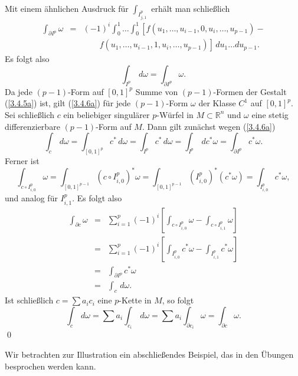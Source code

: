 \documentclass[a4paper,twoside,DIV15,BCOR12mm]{scrbook}
\begin{document}
Mit einem ähnlichen Ausdruck für $\int_{I_{j,1}^{p}}$ erhält man 
schließlich
\begin{eqnarray*}
\int_{\partial I^{p}} \omega & = & (-1)^{i} \int_{0}^{1} \dots 
\int_{0}^{1} \left[ f(u_{1},\dots,u_{i-1},0,u_{i},\dots,u_{p-1}) - 
\right. \\
&   & \qquad \left. 
f(u_{1},\dots,u_{i-1},1,u_{i},\dots,u_{p-1})\right] \, du_{1} \dots 
du_{p-1}. 
\end{eqnarray*}
Es folgt also
\begin{equation}\label{3.4.6a}
\int_{I^{p}} \, d\omega = \int_{\partial I^{p}} \omega.
\end{equation}
Da jede $(p-1)$-Form auf $[0,1]^{p}$ Summe von $(p-1)$-Formen der 
Gestalt (\ref{3.4.5a}) ist, gilt (\ref{3.4.6a}) für jede $(p-1)$-Form 
$\omega$ der Klasse $C^{1}$ auf $[0,1]^{p}$.\\

\noindent
Sei schließlich $c$ ein beliebiger singulärer $p$-Würfel in $M 
\subset {\mathbb R}^{n}$ und $\omega$ eine stetig differenzierbare 
$(p-1)$-Form auf $M$. Dann gilt zunächst wegen (\ref{3.4.6a})
\[
\int_{c} \, d\omega  =  \int_{[0,1]^{p}} c^{*} \, d\omega = 
\int_{I^{p}} c^{*} \, d\omega = \int_{I^{p}} \, dc^{*} \omega 
 =  \int_{\partial I^{p}} c^{*} \omega.
\]
Ferner ist
\[
\int_{c \circ I_{i,0}^{p}} \omega = \int_{[0,1]^{p-1}} (c \circ 
I_{i,0}^{p})^{*} \omega = \int_{[0,1]^{p-1}} (I_{i,0}^{p})^{*} 
(c^{*} \omega) =\int_{I_{i,0}^{p}} c^{*} \omega,
\]
und analog für $I_{i,1}^{p}$. Es folgt also
\begin{eqnarray*}
\int_{\partial c} \omega & = & \sum_{i=1}^{p} (-1)^{i} \left[ 
\int_{c \circ I_{i,0}^{p}} \omega - \int_{c \circ I_{i,1}^{p}} \omega 
\right] \\
& = & \sum_{i=1}^{p}(-1)^{i} \left[ \int_{I_{i,0}^{p}} c^{*} \omega - 
\int_{I_{i,1}^{p}} c^{*} \omega \right] \\
& = & \int_{\partial I^{p}} c^{*} \omega \\
& = & \int_{c} \, d\omega.
\end{eqnarray*}
Ist schließlich $c = \sum a_{i} c_{i}$ eine $p$-Kette in $M$, so 
folgt
\[ \int_{c} \, d\omega = \sum a_{i} \int_{c_{i}} \, d\omega = \sum 
a_{i} \int_{\partial c_{i}} \omega = \int_{\partial c} \omega. \]
\qed\\

\bigskip

\noindent
Wir betrachten zur Illustration ein abschließendes Beispiel, das in 
den Übungen besprochen werden kann. 
\end{document}
